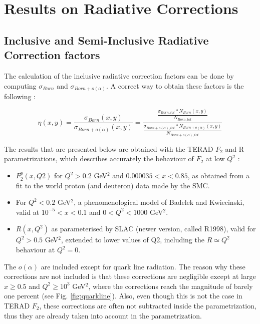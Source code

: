
\chapter{Results on Radiative Corrections} %

\label{ch:RC} %


\section{Inclusive and Semi-Inclusive Radiative Correction factors}

The calculation of the inclusive radiative correction factors can be done by computing
$\sigma_{Born}$ and $\sigma_{Born+o(\alpha)}$. A correct way to obtain these factors is the following :

\[\eta(x,y)=\frac{\sigma_{Born}(x,y)}{\sigma_{Born+o(\alpha)}(x,y)}
=\frac{\frac{\sigma_{Born,tot}*N_{Born}(x,y)}{N_{Born,tot}}}{\frac{\sigma_{Born+o(\alpha),tot}*N_{Born+o(\alpha)}(x,y)}{N_{Born+o(\alpha),tot}}}\]

The results that are presented below are obtained with the TERAD $F_{2}$ and R parametrizations, which
describes accurately the behaviour of $F_{2}$ at low $Q^{2}$\cite{BPnote} :

\begin{itemize}
\item $F^{p}_{2}(x,Q2)$ for $Q^2 > 0.2$ GeV$^2$ and $0.000035 < x < 0.85$, as obtained from a fit to the
world proton (and deuteron) data made by the SMC\cite{SMC}.
\item For $Q^2 < 0.2$ GeV$^2$, a phenomenological model of Badelek and Kwiecinski\cite{BK}, valid at $10^{-5} < x < 0.1$
and $0 < Q^2 < 1000$ GeV$^2$.
\item $R(x, Q^2)$ as parameterised by SLAC (newer version, called R1998\cite{R1998}), valid for $Q^2 > 0.5$ GeV$^2$, extended
to lower values of Q2, including the $R \simeq Q^2$ behaviour at $Q^2 = 0$.
\end{itemize}

The $o(\alpha)$ are included except for quark line radiation. The reason why these corrections are not
included is that these corrections are negligible except at large $x \geq 0.5$ and $Q^{2} \geq 10^3$ GeV$^2$,
where the corrections reach the magnitude of barely one percent (see Fig. \ref{fig:quarkline}). Also, even though this is not the
case in TERAD $F_{2}$, these corrections are often not subtracted inside the parametrization, thus
they are already taken into account in the parametrization\cite{HubertF2Rad}.

